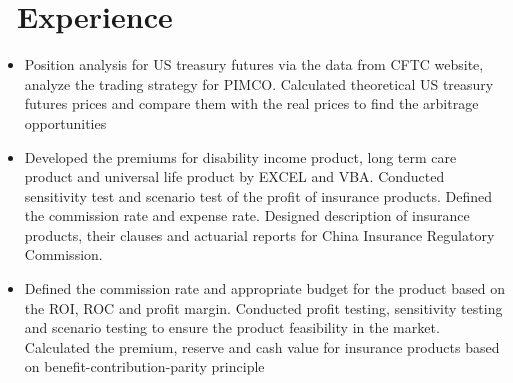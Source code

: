 \documentclass{resume}
\begin{document}
\section{\faGears\ Experience}
\large {}
\begin{itemize}\large
  \item Position analysis for US treasury futures via the data from CFTC website, analyze the trading strategy for PIMCO. Calculated theoretical US treasury futures prices and compare them with the real prices to find the arbitrage opportunities
\end{itemize}
\large {}
\begin{itemize}\large
  \item Developed the premiums for disability income product, long term care product and universal life product by EXCEL and VBA. Conducted sensitivity test and scenario test of the profit of insurance products. Defined the commission rate and expense rate. Designed description of insurance products, their clauses and actuarial reports for China Insurance Regulatory Commission.
  
  
\end{itemize}

\large {}
\begin{itemize}\large
  \item Defined the commission rate and appropriate budget for the product based on the ROI, ROC and profit margin. Conducted profit testing, sensitivity testing and scenario testing to ensure the product feasibility in the market. Calculated the premium, reserve and cash value for insurance products based on benefit-contribution-parity principle
    
\end{itemize}
\end{document}
